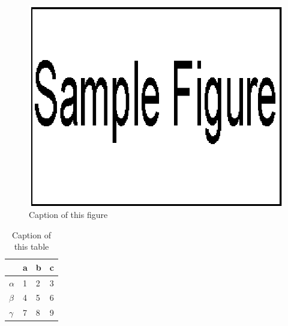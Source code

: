 \documentclass[10pt,twocolumn]{jarticle} %
\begin{document}
%
\begin{figure}[tb]
\begin{center}
\includegraphics[width=0.8\columnwidth]{sample.eps}
\vspace{-10pt}     %
\end{center}
\caption{Caption of this figure}
\label{fig:thisfigure}
\end{figure}
%
%
\begin{table}
\caption{Caption of this table}
\label{tbl:thistable}
\begin{center}
\begin{tabular}{|l|lll|}\hline
& a & b & c\\\hline
$\alpha$ & 1 & 2 & 3\\
$\beta$ & 4 & 5 & 6\\
$\gamma$ & 7 & 8 & 9\\\hline
\end{tabular}
\vspace{-10pt}   %
\end{center}
\end{table}
%
%
\end{document}
